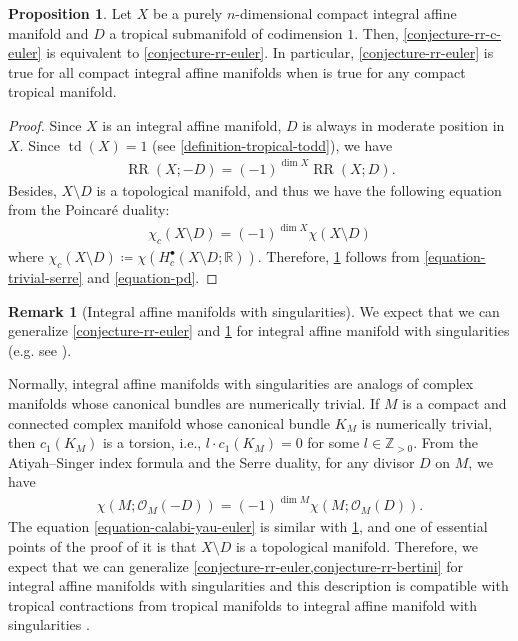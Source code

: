 \documentclass[a4paper,dvipdfmx,reqno,12pt]{amsart}
\theoremstyle{definition}
\newtheorem{proposition}[theorem]{Proposition}
\newtheorem{remark}[theorem]{Remark}
\newcommand{\deq}{\coloneqq}
\newcommand{\opn}[1]{\operatorname{#1}}
\numberwithin{equation}{section}
\begin{document}
\begin{proposition}
\label{proposition-divisor-poincare}
Let $X$ be a purely 
$n$-dimensional compact integral
affine manifold and $D$ a tropical submanifold 
of codimension $1$.
Then, \cref{conjecture-rr-c-euler} is 
equivalent to
\cref{conjecture-rr-euler}. In particular,
\cref{conjecture-rr-euler} is true for
all compact integral affine manifolds when
\cite[Conjecture 6.13]{demedrano2023chern} is
true for any compact tropical manifold.
\end{proposition}
\begin{proof}
Since $X$ is an integral affine manifold,
$D$ is always in moderate position in $X$.
Since $\opn{td}(X)=1$ (see \cref{definition-tropical-todd}),
we have
\begin{align}
\label{equation-trivial-serre}
\opn{RR}(X;-D)=(-1)^{\dim X}\opn{RR}(X;D).
\end{align}
Besides, $X\setminus D$ is a topological manifold, 
and thus we have the following equation from 
the Poincar\'e duality:
\begin{align}
\label{equation-pd}
\chi_c(X\setminus D)=(-1)^{\dim X}\chi(X\setminus D)
\end{align}
where $\chi_c(X\setminus D)\deq 
\chi(H^{\bullet}_c(X\setminus D;\mathbb{R}))$.
Therefore, \cref{proposition-divisor-poincare} follows from
\cref{equation-trivial-serre} and
\cref{equation-pd}.
\end{proof}

\begin{remark}[{Integral affine manifolds with singularities}]
\label{remark-iass}
We expect that we can generalize
\cref{conjecture-rr-euler} and 
\cref{proposition-divisor-poincare}
for integral affine manifold with singularities
(e.g. see \cite{MR2213573,MR2181810,MR4347312}).

Normally, integral affine manifolds with singularities
are analogs of complex manifolds whose canonical bundles
are numerically trivial. If $M$ is a compact and
connected complex manifold whose canonical bundle $K_M$ is
numerically trivial, then $c_1(K_M)$ is a torsion,
i.e., $l\cdot c_1(K_M)=0$ for 
some $l\in \mathbb{Z}_{>0}$.
From the Atiyah--Singer index formula and the Serre duality, 
for any divisor $D$ on $M$, we have
\begin{align}
\label{equation-calabi-yau-euler}
\chi(M;\mathcal{O}_M(-D))=(-1)^{\dim M}
\chi(M;\mathcal{O}_{M}(D)).
\end{align}
The equation \cref{equation-calabi-yau-euler} is
similar with
\cref{proposition-divisor-poincare}, and 
one of essential points of the proof of it
is that $X\setminus D$ is a topological manifold.
Therefore, we expect that we can generalize
\cref{conjecture-rr-euler,conjecture-rr-bertini} for 
integral affine manifolds with singularities
and this description is compatible with
tropical contractions from tropical manifolds
to integral affine manifold with singularities
\cite{yamamoto2021tropical}.
\end{remark}
\end{document}
